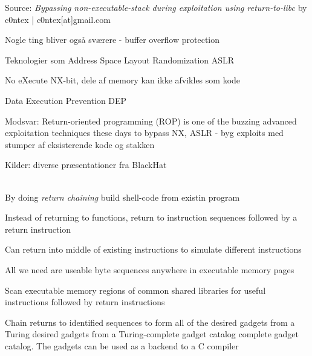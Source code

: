 \documentclass[Screen16to9,17pt]{foils}
\begin{document}
Source:
\emph{Bypassing non-executable-stack during exploitation using return-to-libc}
 by c0ntex | c0ntex[at]gmail.com


\begin{list1}
\item Nogle ting bliver også sværere - buffer overflow protection
\item Teknologier som Address Space Layout Randomization ASLR\\ 
\item No eXecute NX-bit, dele af memory kan ikke afvikles som kode
\item Data Execution Prevention DEP\\
\item Modsvar: Return-oriented programming (ROP) is one of the buzzing advanced exploitation techniques these days to bypass NX, ASLR - byg exploits med stumper af eksisterende kode og stakken
\end{list1}

Kilder: diverse præsentationer fra BlackHat\\
\\
{\footnotesize{}}


\begin{list2}
\item By doing \emph{return chaining} build shell-code from existin program
\item Instead of returning to
functions, return to
instruction sequences
followed by a return
instruction

\item Can return into middle of
existing instructions to
simulate different
instructions

\item All we need are useable
byte sequences anywhere
in executable memory
pages
\item Scan executable memory regions of common shared
libraries for useful instructions followed by return
instructions
\item Chain returns to identified sequences to form all of the
desired gadgets from a Turing desired gadgets from
a Turing-complete gadget catalog complete gadget catalog. The gadgets can be used as a backend to a C compiler
\end{list2}
\end{document}
